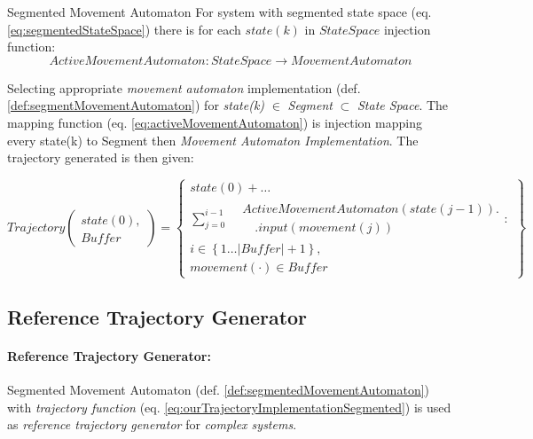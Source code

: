 \begin{definition}{Segmented Movement Automaton}\label{def:segmentedMovementAutomaton}
    For system with segmented state space (eq. \ref{eq:segmentedStateSpace}) there is for each $state(k)$ in $StateSpace$ injection function:
    \begin{equation} \label{eq:activeMovementAutomaton}
        ActiveMovementAutomaton:StateSpace\to MovementAutomaton
    \end{equation}
    
    Selecting appropriate \emph{movement automaton} implementation (def. \ref{def:segmentMovementAutomaton}) for \emph{state(k)} $\in$ \emph{Segment} $\subset$ \emph{State Space}. The mapping function (eq. \ref{eq:activeMovementAutomaton}) is injection mapping every state(k) to Segment then \emph{Movement Automaton Implementation}. The trajectory generated is then given:
    
    \begin{equation}\label{eq:ourTrajectoryImplementationSegmented}
        Trajectory\left(\begin{gathered}state(0),\\Buffer\end{gathered}\right)= 
        \left\{
            \begin{gathered}
                state(0)+\dots\\\sum_{j=0}^{i-1} 
                    \begin{aligned} 
                        &ActiveMovementAutomaton(state(j-1)).\\
                        &\quad.input(movement(j))
                    \end{aligned}:\\
                i \in\left\{1\dots |Buffer|+1\right\}, \\
                movement(\cdot) \in Buffer
            \end{gathered}
        \right\}
    \end{equation}
    
\end{definition}

\subsection{Reference Trajectory Generator}\label{s:referenceTrajectoryGenerator}

\paragraph{Reference Trajectory Generator:} Segmented Movement Automaton (def.  \ref{def:segmentedMovementAutomaton}) with \emph{trajectory function} (eq. \ref{eq:ourTrajectoryImplementationSegmented}) is used as \emph{reference trajectory generator} for \emph{complex systems}. 

